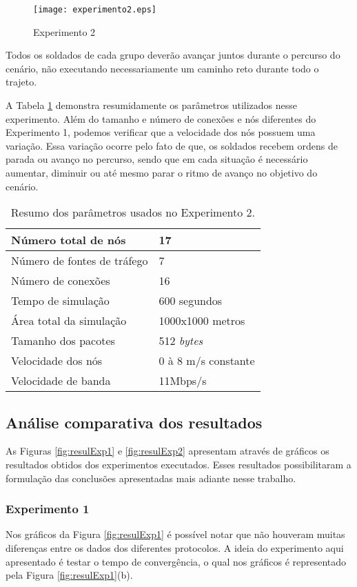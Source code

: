 \begin{figure}[H]
	\centering
	\texttt{[image: experimento2.eps]}
	\caption{Experimento 2}
	\label{figExp2}
\end{figure}

Todos os soldados de cada grupo dever\~ao avan\c{c}ar juntos durante o percurso do cen\'ario, n\~ao executando necessariamente um caminho reto durante todo o trajeto.

A Tabela \ref{tabParamExp2} demonstra resumidamente os par\^ametros utilizados nesse experimento. 
Al\'em do tamanho e n\'umero de conex\~oes e n\'os diferentes do Experimento 1, podemos verificar que a velocidade dos n\'os possuem uma varia\c{c}\~ao.
Essa varia\c{c}\~ao ocorre pelo fato de que, os soldados recebem ordens de parada ou avan\c{c}o no percurso, sendo que em cada situa\c{c}\~ao \'e necess\'ario aumentar, diminuir ou at\'e mesmo parar o ritmo de avan\c{c}o no objetivo do cen\'ario.

\begin{table}[H]
	\centering
	\caption{Resumo dos par\^ametros usados no Experimento 2.}
	\begin{tabular}{ | l | l | }
		\hline
		N\'umero total de n\'os & 17 \\ \hline
		N\'umero de fontes de tr\'afego & 7 \\ \hline
		N\'umero de conex\~oes & 16 \\ \hline
		Tempo de simula\c{c}\~ao & 600 segundos \\ \hline
		\'Area total da simula\c{c}\~ao & 1000x1000 metros \\ \hline
		Tamanho dos pacotes & 512 \textit{bytes} \\ \hline
		Velocidade dos n\'os & 0 \`a 8 m/s constante \\ \hline
		Velocidade de banda & 11Mbps/s \\ \hline
	\end{tabular}
	\label{tabParamExp2}
\end{table}

\subsection{An\'alise comparativa dos resultados}
As Figuras \ref{fig:resulExp1} e \ref{fig:resulExp2} apresentam atrav\'es de gr\'aficos os resultados obtidos dos experimentos executados. Esses resultados possibilitaram a formula\c{c}\~ao das conclus\~oes apresentadas mais adiante nesse trabalho.

\subsubsection{Experimento 1}
Nos gr\'aficos da Figura \ref{fig:resulExp1} \'e poss\'ivel notar que n\~ao houveram muitas diferen\c{c}as entre os dados dos diferentes protocolos. A ideia do experimento aqui apresentado \'e testar o tempo de converg\^encia, o qual nos gr\'aficos \'e representado pela Figura \ref{fig:resulExp1}(b).

